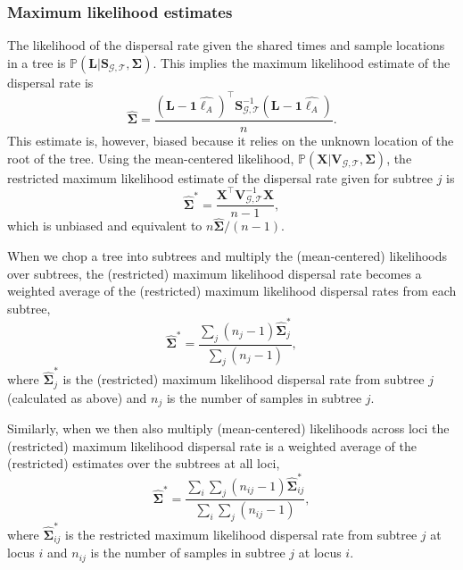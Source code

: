 \documentclass[12pt]{article}
\begin{document}
\subsubsection*{Maximum likelihood estimates}


The likelihood of the dispersal rate given the shared times and sample locations in a tree is $\mathbb{P}(\mathbf{L} | \mathbf{S}_{\mathcal{G},\mathcal{T}}, \mathbf{\Sigma})$.
This implies the maximum likelihood estimate of the dispersal rate is
%
\begin{equation}\label{eq:MLEsigma}
\widehat{\mathbf{\Sigma}} = \frac{(\mathbf{L} - \mathbf{1}\widehat{\bm{\ell}_A})^\intercal \mathbf{S}_{\mathcal{G},\mathcal{T}}^{-1}(\mathbf{L} - \mathbf{1}\widehat{\bm{\ell}_A})}{n}.
\end{equation}
%
This estimate is, however, biased because it relies on the unknown location of the root of the tree. 
Using the mean-centered likelihood, $\mathbb{P}(\mathbf{X} | \mathbf{V}_{\mathcal{G},\mathcal{T}}, \mathbf{\Sigma})$, the restricted maximum likelihood estimate of the dispersal rate given for subtree $j$ is
%
\begin{equation}\label{eq:RMLEsigma}
\widehat{\mathbf{\Sigma}}^* = \frac{\mathbf{X}^\intercal \mathbf{V}_{\mathcal{G},\mathcal{T}}^{-1}\mathbf{X}}{n-1},
\end{equation}
%
which is unbiased and equivalent to $n\widehat{\mathbf{\Sigma}}/(n-1)$.

When we chop a tree into subtrees and multiply the (mean-centered) likelihoods over subtrees, the (restricted) maximum likelihood dispersal rate becomes a weighted average of the (restricted) maximum likelihood dispersal rates from each subtree,
\begin{equation}\label{eq:RMLEsigma_subtrees}
  \widehat{\mathbf{\Sigma}}^* = \frac{\sum_j(n_j-1)\widehat{\mathbf{\Sigma}}^*_j}{\sum_j (n_j - 1)},
  \end{equation}
where $\widehat{\mathbf{\Sigma}}^*_j$ is the (restricted) maximum likelihood dispersal rate from subtree $j$ (calculated as above) and $n_j$ is the number of samples in subtree $j$.

Similarly, when we then also multiply (mean-centered) likelihoods across loci the (restricted) maximum likelihood dispersal rate is a weighted average of the (restricted) estimates over the subtrees at all loci,
\begin{equation}\label{eq:RMLEsigma_subtrees_loci}
  \widehat{\mathbf{\Sigma}}^* = \frac{\sum_i\sum_j(n_{ij}-1)\widehat{\mathbf{\Sigma}}^*_{ij}}{\sum_i\sum_j (n_{ij} - 1)},
  \end{equation}
where $\widehat{\mathbf{\Sigma}}^*_{ij}$ is the restricted maximum likelihood dispersal rate from subtree $j$ at locus $i$ and $n_{ij}$ is the number of samples in subtree $j$ at locus $i$.
\end{document}
